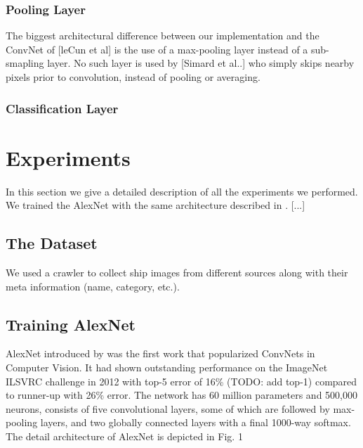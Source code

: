 \documentclass{sig-alternate}
\begin{document}
       \subsubsection{Pooling Layer}
       The biggest architectural difference between our implementation and the ConvNet of [leCun et al] is the use of a max-pooling layer instead of a sub-smapling layer. No such layer is used by [Simard et al..] who simply skips nearby pixels prior to convolution, instead of pooling or averaging. 
       \subsubsection{Classification Layer}

\section{Experiments}
In this section we give a detailed description of all the experiments we performed. We trained the AlexNet with the same architecture described in \citep{NIPS2012_4824}. [...] 
       \subsection{The Dataset}
       We used a crawler to collect ship images from different sources along with their meta information (name, category, etc.).
       \subsection{Training AlexNet}
              AlexNet introduced by \citep{NIPS2012_4824} was the first work that popularized ConvNets in Computer Vision. It had shown outstanding performance on the ImageNet ILSVRC challenge in 2012 with top-5 error of 16\% (TODO: add top-1) compared to runner-up with 26\% error. The network has 60 million parameters and 500,000 neurons, consists of five convolutional layers, some of which are followed by max-pooling layers, and two globally connected layers with a final 1000-way softmax. The detail architecture of AlexNet is depicted in Fig. 1
\end{document}
